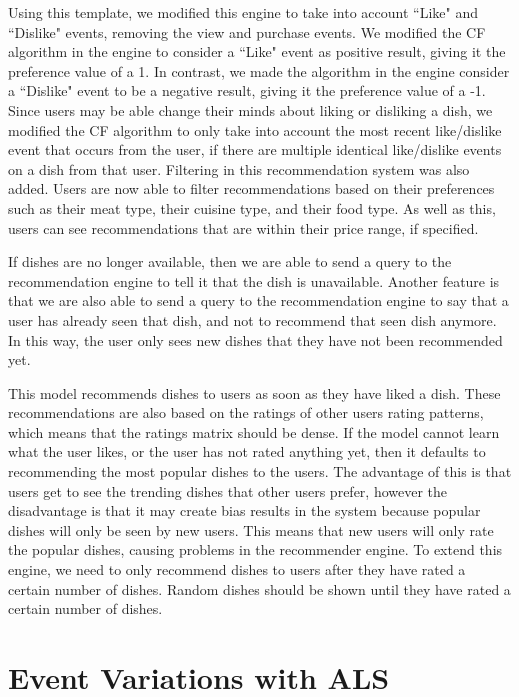 Using this template, we modified this engine to take into account ``Like" and ``Dislike" events, removing the view and purchase events. We modified the CF algorithm in the engine to consider a ``Like" event as positive result, giving it the preference value of a 1. In contrast, we made the algorithm in the engine consider a ``Dislike" event to be a negative result, giving it the preference value of a -1. Since users may be able change their minds about liking or disliking a dish, we modified the CF algorithm to only take into account the most recent like/dislike event that occurs from the user, if there are multiple identical like/dislike events on a dish from that user. Filtering in this recommendation system was also added. Users are now able to filter recommendations based on their preferences such as their meat type, their cuisine type, and their food type. As well as this, users can see recommendations that are within their price range, if specified. 

If dishes are no longer available, then we are able to send a query to the recommendation engine to tell it that the dish is unavailable. Another feature is that we are also able to send a query to the recommendation engine to say that a user has already seen that dish, and not to recommend that seen dish anymore. In this way, the user only sees new dishes that they have not been recommended yet.

This model recommends dishes to users as soon as they have liked a dish. These recommendations are also based on the ratings of other users rating patterns, which means that the ratings matrix should be dense. If the model cannot learn what the user likes, or the user has not rated anything yet, then it defaults to recommending the most popular dishes to the users. The advantage of this is that users get to see the trending dishes that other users prefer, however the disadvantage is that it may create bias results in the system because popular dishes will only be seen by new users. This means that new users will only rate the popular dishes, causing problems in the recommender engine. To extend this engine, we need to only recommend dishes to users after they have rated a certain number of dishes. Random dishes should be shown until they have rated a certain number of dishes. 


\section{Event Variations with ALS}

